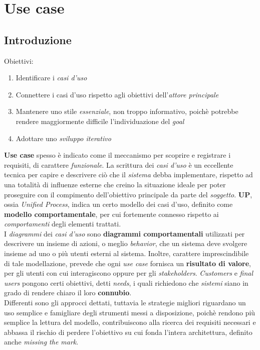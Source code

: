 \documentclass{article}
\begin{document}
\pagestyle{empty}

\section*{Use case}
\large
\subsection*{Introduzione}
Obiettivi:
\begin{enumerate}
    \renewcommand{\labelenumi}{-}
    \itemsep0em
    \item Identificare i \textit{casi d'uso}
    \item Connettere i casi d'uso rispetto agli obiettivi dell'\textit{attore principale}
    \item Mantenere uno stile \textit{essenziale}, non troppo informativo, poichè potrebbe rendere maggiormente difficile l'individuazione del \textit{goal}
    \item Adottare uno \textit{sviluppo iterativo} 
\end{enumerate}
\textbf{Use case} spesso è indicato come il meccanismo per scoprire e registrare i requisiti, di carattere \textit{funzionale}. La scrittura dei \textit{casi d'uso} è un eccellente tecnica per capire e descrivere ciò che il \textit{sistema} debba implementare, rispetto ad una totalità di influenze esterne che creino la situazione ideale per poter proseguire con il compimento dell'obiettivo principale da parte del \textit{soggetto}.
\textbf{UP}, ossia \textit{Unified Process}, indica un certo modello dei casi d'uso, definito come \textbf{modello comportamentale}, per cui fortemente connesso rispetto ai \textit{comportamenti} degli elementi trattati.\vspace*{14pt}\\
I \textit{diagrammi} dei \textit{casi d'uso} sono \textbf{diagrammi comportamentali} utilizzati per descrivere un insieme di azioni, o meglio \textit{behavior}, che un sistema deve svolgere insieme ad uno o più utenti esterni al sistema. Inoltre, carattere imprescindibile di tale modellazione, prevede che ogni \textit{use case} fornisca un \textbf{risultato di valore}, per gli utenti con cui interagiscono oppure per gli \textit{stakeholders}. \textit{Customers} e \textit{final users} pongono certi obiettivi, detti \textit{needs}, i quali richiedono che \textit{sistemi} siano in grado di rendere chiaro il loro \textbf{connubio}.\vspace*{14pt}\\
Differenti sono gli approcci dettati, tuttavia le strategie migliori riguardano un uso semplice e famigliare degli strumenti messi a disposizione, poichè rendono più semplice la lettura del modello, contribuiscono alla ricerca dei requisiti necessari e abbassa il rischio di perdere l'obiettivo su cui fonda l'intera architettura, definito anche \textit{missing the mark}.\\
\end{document}

